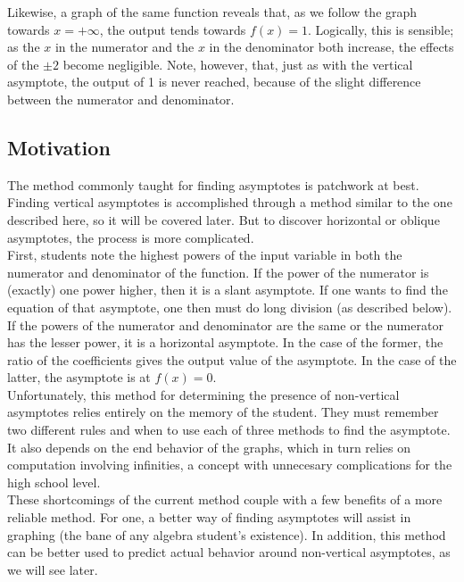 \documentclass[12pt]{article}
\begin{document}
Likewise, a graph of the same function reveals that, as we follow the graph
towards \(x = +\infty \), the output tends towards \(f(x) = 1\). Logically, this
is sensible; as the $x$ in the numerator and the $x$ in the denominator both
increase, the effects of the $\pm 2$ become negligible. Note, however, that, 
just as with the vertical asymptote, the output of 1 is never reached, because 
of the slight difference between the numerator and denominator. \\

\subsection{Motivation}

The method commonly taught for finding asymptotes is patchwork at
best. Finding vertical asymptotes is accomplished through a method 
similar to the one described here, so it will be covered later. But to 
discover horizontal or oblique asymptotes, the process is more 
complicated.\\

First, students note the highest powers of the input variable in both
the numerator and denominator of the function. If the power of the 
numerator is (exactly) one power higher, then it is a slant asymptote. If one wants to 
find the equation of that asymptote, one then must do long division
(as described below). If the powers of the numerator and 
denominator are the same or the numerator has the lesser power,
it is a horizontal asymptote. In the case of the former, the ratio of
the coefficients gives the output value of the asymptote. In the case 
of the latter, the asymptote is at $f(x) = 0$.\\

Unfortunately, this method for determining the presence of 
non-vertical asymptotes relies entirely on the memory of the student. 
They must remember two different rules and when to use each of
three methods to find the asymptote. 
It also depends on the end     %
behavior of the graphs, which in turn relies on computation involving infinities, a 
concept with unnecesary complications for the high school level. \\			%

These shortcomings of the current method couple with a few benefits
of a more reliable method. For one, a better way of finding asymptotes
will assist in graphing (the bane of any algebra student's existence). 
In addition, this method can be better used to predict actual behavior 
around non-vertical asymptotes, as we will see later.\\
\end{document}
